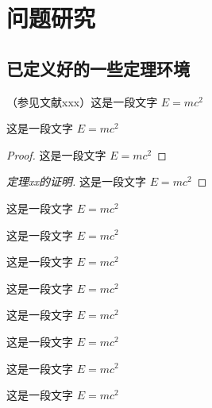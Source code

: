 \chapter{问题研究}


\section{已定义好的一些定理环境}


\begin{definition}[测度]
  （参见文献xxx）这是一段文字 $E = m c^2$
\end{definition}

\begin{theorem}
  这是一段文字 $E = m c^2$
\end{theorem}

\begin{proof}
  这是一段文字 $E = m c^2$
\end{proof}

\begin{proof}[定理xx的证明]
  这是一段文字 $E = m c^2$
\end{proof}

\begin{example}
  这是一段文字 $E = m c^2$
\end{example}

\begin{property}
  这是一段文字 $E = m c^2$
\end{property}

\begin{proposition}
  这是一段文字 $E = m c^2$
\end{proposition}

\begin{corollary}
  这是一段文字 $E = m c^2$
\end{corollary}

\begin{lemma}
  这是一段文字 $E = m c^2$
\end{lemma}

\begin{axiom}
  这是一段文字 $E = m c^2$
\end{axiom}

\begin{antiexample}
  这是一段文字 $E = m c^2$
\end{antiexample}

\begin{conjecture}
  这是一段文字 $E = m c^2$
\end{conjecture}

